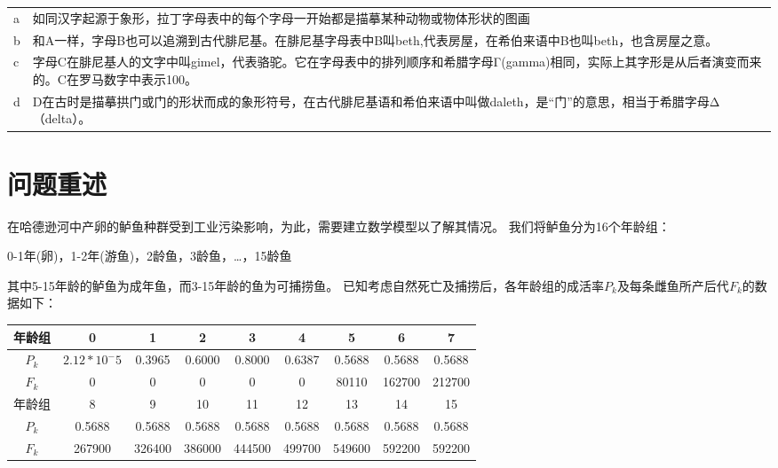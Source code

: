 \documentclass[experiment, printoneside]{seucoursepaper} %
\begin{document}
\tableofcontents

\begin{terminology}
\begin{table}[h]
\renewcommand\arraystretch{1.5}
\begin{tabular}{>{\LARGE}m{} <{\centering}m{}}
a & 如同汉字起源于象形，拉丁字母表中的每个字母一开始都是描摹某种动物或物体形状的图画\\

b&和A一样，字母B也可以追溯到古代腓尼基。在腓尼基字母表中B叫beth,代表房屋，在希伯来语中B也叫beth，也含房屋之意。\\

c& 字母C在腓尼基人的文字中叫gimel，代表骆驼。它在字母表中的排列顺序和希腊字母Γ(gamma)相同，实际上其字形是从后者演变而来的。C在罗马数字中表示100。\\

d&D在古时是描摹拱门或门的形状而成的象形符号，在古代腓尼基语和希伯来语中叫做daleth，是“门”的意思，相当于希腊字母Δ（delta）。\\

\end{tabular}
\end{table}
\end{terminology}


\section{问题重述}
在哈德逊河中产卵的鲈鱼种群受到工业污染影响，为此，需要建立数学模型以了解其情况。
我们将鲈鱼分为16个年龄组：
\begin{center}
    0-1年(卵)，1-2年(游鱼)，2龄鱼，3龄鱼，…，15龄鱼
\end{center}
其中5-15年龄的鲈鱼为成年鱼，而3-15年龄的鱼为可捕捞鱼。
已知考虑自然死亡及捕捞后，各年龄组的成活率$P_k$及每条雌鱼所产后代$F_k$的数据如下：
\begin{table}
\begin{center}
\begin{tabular}{c c c c c c c c c}
\hline
年龄组 & 0 & 1 &  2 & 3 & 4 & 5 & 6 & 7 \\
\hline
$P_k$ & $2.12*10^-5$ & 0.3965 & 0.6000 & 0.8000 & 0.6387 & 0.5688 & 0.5688 & 0.5688 \\
$F_k$ & 0 & 0 & 0 & 0 & 0 & 80110 & 162700 & 212700 \\
\hline
\hline
年龄组 & 8 & 9 &  10 & 11 & 12 & 13 & 14 & 15 \\
\hline
$P_k$ & 0.5688 & 0.5688 & 0.5688 & 0.5688 & 0.5688 & 0.5688 & 0.5688 & 0.5688 \\
$F_k$ & 267900 & 326400 & 386000 & 444500 & 499700 & 549600 & 592200 & 592200 \\
\hline
\end{tabular}
\end{center}
\end{table}
\end{document}
